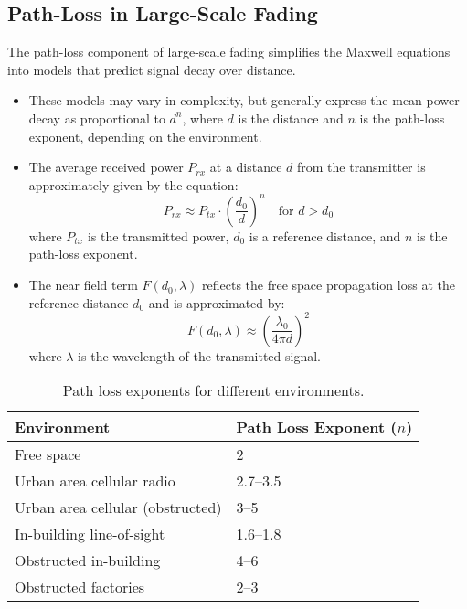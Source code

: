 \subsection*{Path-Loss in Large-Scale Fading}

The path-loss component of large-scale fading simplifies the Maxwell equations into models that predict signal decay over distance.

\begin{itemize}
    \item These models may vary in complexity, but generally express the mean power decay as proportional to \(d^n\), where \(d\) is the distance and \(n\) is the path-loss exponent, depending on the environment.
    \item The average received power \(P_{rx}\) at a distance \(d\) from the transmitter is approximately given by the equation:
    \[
    P_{rx} \approx P_{tx} \cdot \left( \frac{d_0}{d} \right)^n \quad \text{for } d > d_0
    \]
    where \(P_{tx}\) is the transmitted power, \(d_0\) is a reference distance, and \(n\) is the path-loss exponent.
    \item The near field term \(F(d_0, \lambda)\) reflects the free space propagation loss at the reference distance \(d_0\) and is approximated by:
    \[
    F(d_0, \lambda) \approx \left( \frac{\lambda_0}{4 \pi d} \right)^2
    \]
    where \(\lambda\) is the wavelength of the transmitted signal.
\end{itemize}

\begin{table}[h!]
\centering
\begin{tabular}{ll}
\hline
\textbf{Environment} & \textbf{Path Loss Exponent (\(n\))} \\
\hline
Free space & 2 \\
Urban area cellular radio & 2.7--3.5 \\
Urban area cellular (obstructed) & 3--5 \\
In-building line-of-sight & 1.6--1.8 \\
Obstructed in-building & 4--6 \\
Obstructed factories & 2--3 \\
\hline
\end{tabular}
\caption{Path loss exponents for different environments.}
\label{table:pathlossexponents}
\end{table}







